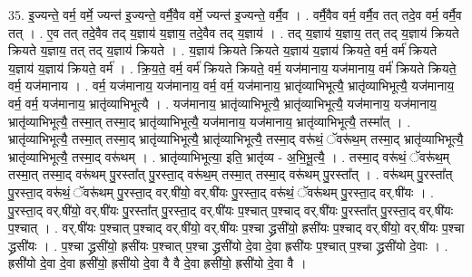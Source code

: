 \documentclass[17pt]{extarticle}
\begin{document}
35. इ॒ज्यन्ते॒ वर्म॒ वर्मे॒ ज्यन्त॑ इ॒ज्यन्ते॒ वर्मै॒वैव वर्मे॒ ज्यन्त॑ इ॒ज्यन्ते॒ वर्मै॒व । . वर्मै॒वैव वर्म॒ वर्मै॒व तत् तदे॒व वर्म॒ वर्मै॒व तत् । . ए॒व तत् तदे॒वैव तद् य॒ज्ञाय॑ य॒ज्ञाय॒ तदे॒वैव तद् य॒ज्ञाय॑ । . तद् य॒ज्ञाय॑ य॒ज्ञाय॒ तत् तद् य॒ज्ञाय॑ क्रियते क्रियते य॒ज्ञाय॒ तत् तद् य॒ज्ञाय॑ क्रियते । . य॒ज्ञाय॑ क्रियते क्रियते य॒ज्ञाय॑ य॒ज्ञाय॑ क्रियते॒ वर्म॒ वर्म॑ क्रियते य॒ज्ञाय॑ य॒ज्ञाय॑ क्रियते॒ वर्म॑ । . क्रि॒य॒ते॒ वर्म॒ वर्म॑ क्रियते क्रियते॒ वर्म॒ यज॑मानाय॒ यज॑मानाय॒ वर्म॑ क्रियते क्रियते॒ वर्म॒ यज॑मानाय । . वर्म॒ यज॑मानाय॒ यज॑मानाय॒ वर्म॒ वर्म॒ यज॑मानाय॒ भ्रातृ॑व्याभिभूत्यै॒ भ्रातृ॑व्याभिभूत्यै॒ यज॑मानाय॒ वर्म॒ वर्म॒ यज॑मानाय॒ भ्रातृ॑व्याभिभूत्यै । . यज॑मानाय॒ भ्रातृ॑व्याभिभूत्यै॒ भ्रातृ॑व्याभिभूत्यै॒ यज॑मानाय॒ यज॑मानाय॒ भ्रातृ॑व्याभिभूत्यै॒ तस्मा॒त् तस्मा॒द् भ्रातृ॑व्याभिभूत्यै॒ यज॑मानाय॒ यज॑मानाय॒ भ्रातृ॑व्याभिभूत्यै॒ तस्मा᳚त् । . भ्रातृ॑व्याभिभूत्यै॒ तस्मा॒त् तस्मा॒द् भ्रातृ॑व्याभिभूत्यै॒ भ्रातृ॑व्याभिभूत्यै॒ तस्मा॒द् वरू॑थं॒ ॅवरू॑थ॒म् तस्मा॒द् भ्रातृ॑व्याभिभूत्यै॒ भ्रातृ॑व्याभिभूत्यै॒ तस्मा॒द् वरू॑थम् । . भ्रातृ॑व्याभिभूत्या॒ इति॒ भ्रातृ॑व्य - अ॒भि॒भू॒त्यै॒ । . तस्मा॒द् वरू॑थं॒ ॅवरू॑थ॒म् तस्मा॒त् तस्मा॒द् वरू॑थम् पु॒रस्ता᳚त् पु॒रस्ता॒द् वरू॑थ॒म् तस्मा॒त् तस्मा॒द् वरू॑थम् पु॒रस्ता᳚त् । . वरू॑थम् पु॒रस्ता᳚त् पु॒रस्ता॒द् वरू॑थं॒ ॅवरू॑थम् पु॒रस्ता॒द् वर्.षी॑यो॒ वर्.षी॑यः पु॒रस्ता॒द् वरू॑थं॒ ॅवरू॑थम् पु॒रस्ता॒द् वर्.षी॑यः । . पु॒रस्ता॒द् वर्.षी॑यो॒ वर्.षी॑यः पु॒रस्ता᳚त् पु॒रस्ता॒द् वर्.षी॑यः प॒श्चात् प॒श्चाद् वर्.षी॑यः पु॒रस्ता᳚त् पु॒रस्ता॒द् वर्.षी॑यः प॒श्चात् । . वर्.षी॑यः प॒श्चात् प॒श्चाद् वर्.षी॑यो॒ वर्.षी॑यः प॒श्चा द्ध्रसी॑यो॒ ह्रसी॑यः प॒श्चाद् वर्.षी॑यो॒ वर्.षी॑यः प॒श्चा द्ध्रसी॑यः । . प॒श्चा द्ध्रसी॑यो॒ ह्रसी॑यः प॒श्चात् प॒श्चा द्ध्रसी॑यो दे॒वा दे॒वा ह्रसी॑यः प॒श्चात् प॒श्चा द्ध्रसी॑यो दे॒वाः । . ह्रसी॑यो दे॒वा दे॒वा ह्रसी॑यो॒ ह्रसी॑यो दे॒वा वै वै दे॒वा ह्रसी॑यो॒ ह्रसी॑यो दे॒वा वै । \newline
\end{document}

